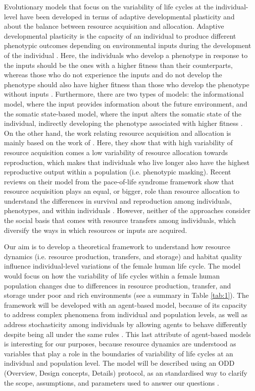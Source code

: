 \documentclass{article}
\begin{document}
Evolutionary models that focus on the variability of life cycles at the individual-level have been developed in terms of adaptive developmental plasticity and about the balance between resource acquisition and allocation. Adaptive developmental plasticity is the capacity of an individual to produce different phenotypic outcomes depending on environmental inputs during the development of the individual \citep{stearns1989evolutionary}. Here, the individuals who develop a phenotype in response to the inputs should be the ones with a higher fitness than their counterparts, whereas those who do not experience the inputs and do not develop the phenotype should also have higher fitness than those who develop the phenotype without inputs \citep{bateson2004developmental}. Furthermore, there are two types of models: the informational model, where the input provides information about the future environment, and the somatic state-based model, where the input alters the somatic state of the individual, indirectly developing the phenotype associated with higher fitness \citep{nettle2015adaptive}. On the other hand, the work relating resource acquisition and allocation is mainly based on the work of \cite{van1986acquisition}. Here, they show that with high variability of resource acquisition comes a low variability of resource allocation towards reproduction, which makes that individuals who live longer also have the highest reproductive output within a population (i.e. phenotypic masking). Recent reviews on their model from the pace-of-life syndrome framework show that resource acquisition plays an equal, or bigger, role than resource allocation to understand the differences in survival and reproduction among individuals, phenotypes, and within individuals \citep{laskowski2021integrating,haave2022differences}. However, neither of the approaches consider the social basis that comes with resource transfers among individuals, which diversify the ways in which resources or inputs are acquired.    

Our aim is to develop a theoretical framework to understand how resource dynamics (i.e. resource production, transfers, and storage) and habitat quality influence individual-level variations of the female human life cycle. The model would focus on how the variability of life cycles within a female human population changes due to differences in resource production, transfer, and storage under poor and rich environments (see a summary in Table \ref{tab:1}). The framework will be developed with an agent-based model, because of its capacity to address complex phenomena from individual and population levels, as well as address stochasticity among individuals by allowing agents to behave differently despite being all under the same rules \citep{judson1994rise,wilensky2015introduction}. This last attribute of agent-based models is interesting for our purposes, because resource dynamics are understood as variables that play a role in the boundaries of variability of life cycles at an individual and population level. The model will be described using an ODD (Overview, Design concepts, Details) protocol, as an standardised way to clarify the scope, assumptions, and parameters used to answer our questions \citep{grimm2006standard,grimm2020odd}.
\end{document}
